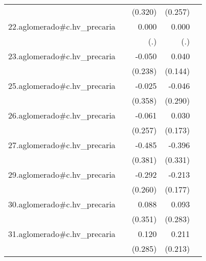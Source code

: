 {\begin{longtable}{l*{4}{D{.}{.}{-1}}}
            &                     &     (0.320)         &     (0.257)         &                     \\
\addlinespace
22.aglomerado#c.hv\_precaria&                     &       0.000         &       0.000         &                     \\
            &                     &         (.)         &         (.)         &                     \\
\addlinespace
23.aglomerado#c.hv\_precaria&                     &      -0.050         &       0.040         &                     \\
            &                     &     (0.238)         &     (0.144)         &                     \\
\addlinespace
25.aglomerado#c.hv\_precaria&                     &      -0.025         &      -0.046         &                     \\
            &                     &     (0.358)         &     (0.290)         &                     \\
\addlinespace
26.aglomerado#c.hv\_precaria&                     &      -0.061         &       0.030         &                     \\
            &                     &     (0.257)         &     (0.173)         &                     \\
\addlinespace
27.aglomerado#c.hv\_precaria&                     &      -0.485         &      -0.396         &                     \\
            &                     &     (0.381)         &     (0.331)         &                     \\
\addlinespace
29.aglomerado#c.hv\_precaria&                     &      -0.292         &      -0.213         &                     \\
            &                     &     (0.260)         &     (0.177)         &                     \\
\addlinespace
30.aglomerado#c.hv\_precaria&                     &       0.088         &       0.093         &                     \\
            &                     &     (0.351)         &     (0.283)         &                     \\
\addlinespace
31.aglomerado#c.hv\_precaria&                     &       0.120         &       0.211         &                     \\
            &                     &     (0.285)         &     (0.213)         &                     \\

\end{longtable}}
